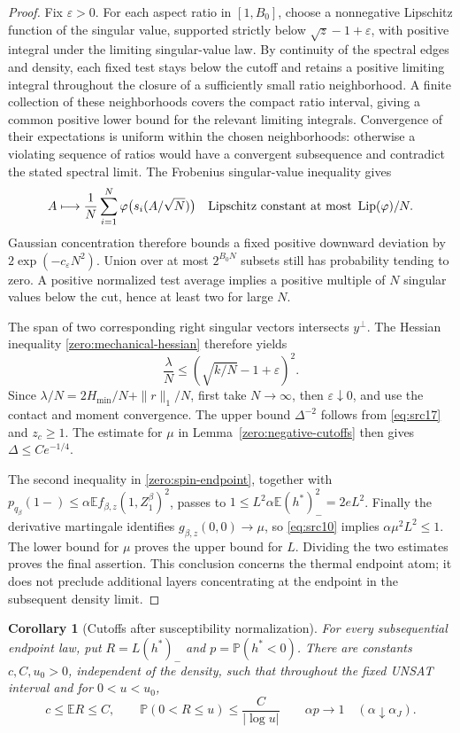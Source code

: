 \documentclass[11pt,a4paper]{article}
\numberwithin{equation}{section}
\newtheorem{corollary}[theorem]{Corollary}
\theoremstyle{definition}
\theoremstyle{remark}
\newcommand{\E}{\mathbb E}
\newcommand{\Prob}{\mathbb P}
\newcommand{\eps}{\varepsilon}
\DeclareMathOperator{\Lip}{Lip}
\begin{document}
\begin{proof}
Fix \(\eps>0\).  For each aspect ratio in \([1,B_0]\), choose a
nonnegative Lipschitz function of the singular value, supported
strictly below \(\sqrt z-1+\eps\), with positive integral under the
limiting singular-value law.  By continuity of the spectral edges and
density, each fixed test stays below the cutoff and retains a positive
limiting integral throughout the closure of a sufficiently small ratio
neighborhood.  A finite collection of these neighborhoods covers the
compact ratio interval, giving a common positive lower bound for the
relevant limiting integrals.  Convergence of their expectations is uniform
within the chosen neighborhoods: otherwise a violating sequence of
ratios would have a convergent subsequence and contradict the stated
spectral limit.  The Frobenius singular-value inequality gives
\[
 A\longmapsto\frac1N\sum_{i=1}^N
 \varphi\bigl(s_i(A/\sqrt N)\bigr)
 \quad\hbox{Lipschitz constant at most }\Lip(\varphi)/N.
\]
Gaussian concentration therefore bounds a fixed positive downward
deviation by \(2\exp(-c_\eps N^2)\).  Union over at most \(2^{B_0N}\)
subsets still has probability tending to zero.  A positive normalized
test average implies a positive multiple of \(N\) singular values
below the cut, hence at least two for large \(N\).

The span of two corresponding right singular vectors intersects
\(y^\perp\).  The Hessian
inequality \eqref{zero:mechanical-hessian} therefore yields
\[
 \frac\lambda N\le(\sqrt{k/N}-1+\eps)^2.
\]
Since \(\lambda/N=2H_{\min}/N+\|r\|_1/N\), first take
\(N\to\infty\), then \(\eps\downarrow0\), and use the contact and
moment convergence.  The upper bound \(\Delta^{-2}\) follows from
\eqref{eq:src17} and \(z_c\ge1\).  The estimate for \(\mu\) in
Lemma~\ref{zero:negative-cutoffs} then gives \(\Delta\le Ce^{-1/4}\).

The second inequality in \eqref{zero:spin-endpoint}, together with
\(p_{q_\beta}(1-)\le\alpha\E f_{\beta,z}(1,Z^\beta_1)^2\), passes to
\(1\le L^2\alpha\E(h^*)_-^2=2eL^2\).
Finally the derivative martingale identifies
\(g_{\beta,z}(0,0)\to\mu\), so \eqref{eq:src10} implies
\(\alpha\mu^2L^2\le1\).  The lower bound for \(\mu\) proves the
upper bound for \(L\).  Dividing the two estimates proves the final
assertion.  This conclusion concerns the thermal endpoint atom;
it does not preclude additional layers concentrating at the endpoint
in the subsequent density limit.
\end{proof}

\begin{corollary}[Cutoffs after susceptibility normalization]
\label{zero:normalized-force-cutoff}
For every subsequential endpoint law, put
\(R=L(h^*)_-\) and \(p=\Prob(h^*<0)\).
There are constants \(c,C,u_0>0\), independent of the density, such
that throughout the fixed UNSAT interval and for \(0<u<u_0\),
\[
 c\le \E R\le C,\qquad
 \Prob(0<R\le u)\le\frac C{|\log u|}
 \qquad \alpha p\longrightarrow1
 \quad(\alpha\downarrow\alpha_J).
\]
\end{corollary}
\end{document}
